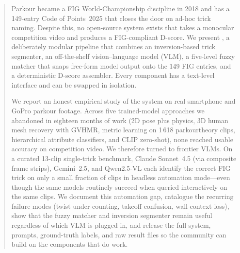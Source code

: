 \begin{abstract}
Parkour became a FIG World-Championship discipline in 2018 and has a
149-entry Code of Points~2025 that closes the door on ad-hoc trick
naming. Despite this, no open-source system exists that takes a
monocular competition video and produces a FIG-compliant D-score.
We present \sys{}, a deliberately modular pipeline that combines
an inversion-based trick segmenter, an off-the-shelf vision--language
model (VLM), a five-level fuzzy matcher that snaps free-form model
output onto the 149 FIG entries, and a deterministic D-score assembler.
Every component has a text-level interface and can be swapped in
isolation.

We report an honest empirical study of the system on real smartphone
and GoPro parkour footage. Across five trained-model approaches we
abandoned in eighteen months of work (2D pose plus physics, 3D human
mesh recovery with GVHMR, metric learning on 1\,618 parkourtheory
clips, hierarchical attribute classifiers, and CLIP zero-shot), none
reached usable accuracy on competition video. We therefore turned to
frontier VLMs. On a curated 13-clip single-trick benchmark, Claude
Sonnet~4.5 (via composite frame strips), Gemini~2.5, and Qwen2.5-VL
each identify the correct FIG trick on only a small fraction of
clips in headless automation mode---even though the same models
routinely succeed when queried interactively on the same clips.
We document this automation gap, catalogue the recurring failure
modes (twist under-counting, takeoff confusion, wall-context loss),
show that the fuzzy matcher and inversion segmenter remain useful
regardless of which VLM is plugged in, and release the full system,
prompts, ground-truth labels, and raw result files so the community
can build on the components that do work.
\end{abstract}
